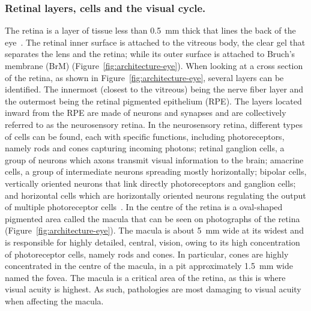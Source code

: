 \documentclass{article}
\begin{document}
\subsubsection{Retinal layers, cells and the visual cycle.}

The retina is a layer of tissue less than \SI{0.5}{\mm} thick that lines the back of the eye~\cite{Gupta_2015}.
The retinal inner surface is attached to the vitreous body, the clear gel that separates the lens and the retina; while its outer surface is attached to Bruch's membrane (BrM) (Figure~\ref{fig:architecture-eye}).
When looking at a cross section of the retina, as shown in Figure~\ref{fig:architecture-eye}, several layers can be identified.
The innermost (closest to the vitreous) being the nerve fiber layer and the outermost being the retinal pigmented epithelium (RPE).
The layers located inward from the RPE are made of neurons and synapses and are collectively referred to as the neurosensory retina.
In the neurosensory retina, different types of cells can be found, each with specific functions,
including photoreceptors, namely rods and cones capturing incoming photons;
retinal ganglion cells, a group of neurons which axons transmit visual information to the brain;
amacrine cells, a group of intermediate neurons spreading mostly horizontally;
bipolar cells, vertically oriented neurons that link directly photoreceptors and ganglion cells;
and horizontal cells which are horizontally oriented neurons regulating the output of multiple photoreceptor cells~\cite{Mahabadi_2022}.
In the centre of the retina is a oval-shaped pigmented area called the macula that can be seen on photographs of the retina (Figure~\ref{fig:architecture-eye}).
The macula is about \SI{5}{\mm} wide at its widest and is responsible for highly detailed, central, vision, owing to its high concentration of photoreceptor cells, namely rods and cones.
In particular, cones are highly concentrated in the centre of the macula, in a pit approximately \SI{1.5}{\mm} wide named the fovea.
The macula is a critical area of the retina, as this is where visual acuity is highest.
As such, pathologies are most damaging to visual acuity when affecting the macula.
\end{document}
